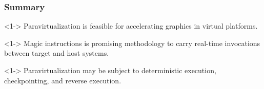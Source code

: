 
\begin{frame}
\frametitle{Summary}

\begin{thm}<1->
	Paravirtualization is feasible for accelerating graphics in virtual platforms.
\end{thm}

\begin{thm}<1->
	Magic instructions is promising methodology to carry real-time invocations between target and host systems.
\end{thm}

\begin{thm}<1->
	Paravirtualization may be subject to deterministic execution, checkpointing, and reverse execution.
\end{thm}

\end{frame}
